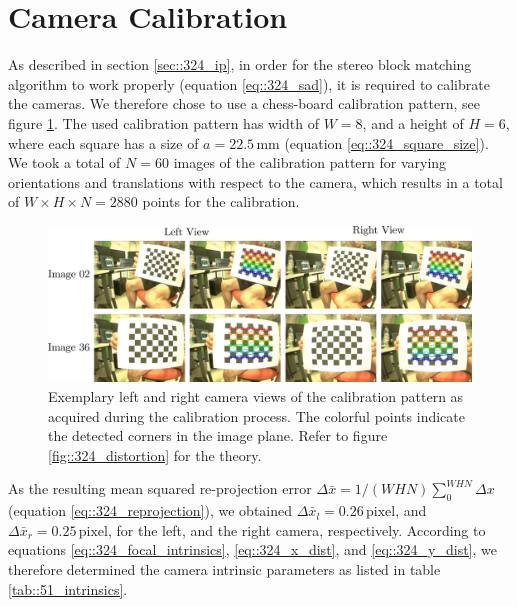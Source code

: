 \section{Camera Calibration}
\label{sec::51_cc}
As described in section \ref{sec::324_ip}, in order for the stereo block matching algorithm to work properly (equation \ref{eq::324_sad}), it is required to calibrate the cameras. We therefore chose to use a chess-board calibration pattern, see figure \ref{fig::51_calib}. The used calibration pattern has width of $W=8$, and a height of $H=6$, where each square has a size of $a=22.5\,\text{mm}$ (equation \ref{eq::324_square_size}). We took a total of $N=60$ images of the calibration pattern for varying orientations and translations with respect to the camera, which results in a total of $W\times H\times N = 2880$ points for the calibration. 
\begin{figure}[h]
	\centering
	\includegraphics[scale=.28]{chapters/05_experiments/img/calib.png}
	\caption{Exemplary left and right camera views of the calibration pattern as acquired during the calibration process. The colorful points indicate the detected corners in the image plane. Refer to figure \ref{fig::324_distortion} for the theory.}
	\label{fig::51_calib}
\end{figure}
As the resulting mean squared re-projection error $\Delta \bar{x} = 1/(WHN)\sum_0^{WHN} \Delta x$ (equation \ref{eq::324_reprojection}), we obtained $\Delta \bar{x}_l = 0.26\, \text{pixel}$, and $\Delta \bar{x}_r = 0.25\,\text{pixel}$, for the left, and the right camera, respectively. According to equations \ref{eq::324_focal_intrinsics}, \ref{eq::324_x_dist}, and \ref{eq::324_y_dist}, we therefore determined the camera intrinsic parameters as listed in table \ref{tab::51_intrinsics}.
